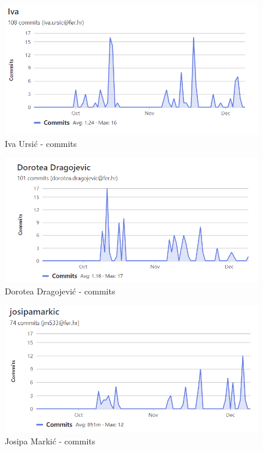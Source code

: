 			 \begin{figure}[H]
				\includegraphics[scale=1]{slike/commits_iva_ursic.png} %
				
				\centering
				\caption{Iva Ursić - commits}
				\label{fig:Iva Ursić commits}
				\end{figure}
			 \begin{figure}[H]
				\includegraphics[scale=1]{slike/commits_dorotea_dragojevic.png} %
				
				\centering
				\caption{Dorotea Dragojević - commits}
				\label{fig:Dorotea Dragojević - commits}
				\end{figure}
			 \begin{figure}[H]
				\includegraphics[scale=1]{slike/commits_josipa_markic.png} %
				
				\centering
				\caption{Josipa Markić - commits}
				\label{fig:Josipa Markić commits}
				\end{figure}
